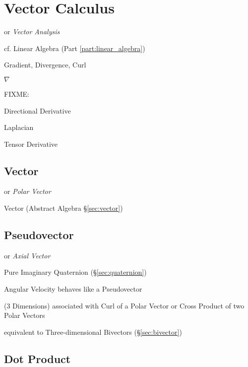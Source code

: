 \section{Vector Calculus}\label{sec:vector_calculus}

or \emph{Vector Analysis}

\fist cf. Linear Algebra (Part \ref{part:linear_algebra})

Gradient, Divergence, Curl

$\nabla$

FIXME:

Directional Derivative

Laplacian

Tensor Derivative



\subsection{Vector}\label{sec:linear_vector}

or \emph{Polar Vector}

\fist Vector (Abstract Algebra \S\ref{sec:vector})



\subsection{Pseudovector}\label{sec:pseudovector}

or \emph{Axial Vector}

\fist Pure Imaginary Quaternion (\S\ref{sec:quaternion})

Angular Velocity behaves like a Pseudovector

(3 Dimensions) associated with Curl of a Polar Vector or Cross Product of two
Polar Vectors

equivalent to Three-dimensional Bivectors (\S\ref{sec:bivector})



\subsection{Dot Product}\label{sec:dot_product}

